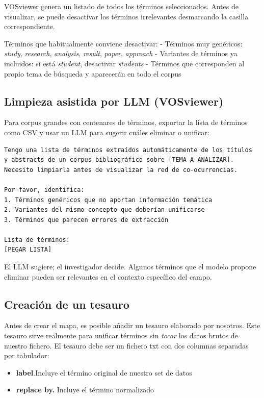 \documentclass[
]{book}
\begin{document}
VOSviewer genera un listado de todos los términos seleccionados. Antes de visualizar, se puede desactivar los términos irrelevantes desmarcando la casilla correspondiente.

Términos que habitualmente conviene desactivar: - Términos muy genéricos: \emph{study}, \emph{research}, \emph{analysis}, \emph{result}, \emph{paper}, \emph{approach} - Variantes de términos ya incluidos: si está \emph{student}, desactivar \emph{students} - Términos que corresponden al propio tema de búsqueda y aparecerán en todo el corpus

\subsection{Limpieza asistida por LLM (VOSviewer)}\label{limpieza-asistida-por-llm-vosviewer}

Para corpus grandes con centenares de términos, exportar la lista de términos como CSV y usar un LLM para sugerir cuáles eliminar o unificar:

\begin{verbatim}
Tengo una lista de términos extraídos automáticamente de los títulos
y abstracts de un corpus bibliográfico sobre [TEMA A ANALIZAR].
Necesito limpiarla antes de visualizar la red de co-ocurrencias.

Por favor, identifica:
1. Términos genéricos que no aportan información temática
2. Variantes del mismo concepto que deberían unificarse
3. Términos que parecen errores de extracción

Lista de términos:
[PEGAR LISTA]
\end{verbatim}

El LLM sugiere; el investigador decide. Algunos términos que el modelo propone eliminar pueden ser relevantes en el contexto específico del campo.

\subsection{Creación de un tesauro}\label{creaciuxf3n-de-un-tesauro}

Antes de crear el mapa, es posible añadir un tesauro elaborado por nosotros. Este tesauro sirve realmente para unificar términos sin \emph{tocar} los datos brutos de nuestro fichero. El tesauro debe ser un fichero txt con dos columnas separadas por tabulador:

\begin{itemize}
\item
  \textbf{label}.Incluye el término original de nuestro set de datos
\item
  \textbf{replace by.} Incluye el término normalizado
\end{itemize}
\end{document}
